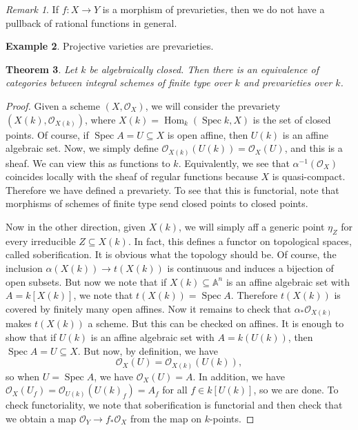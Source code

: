 \documentclass[leqno, openany]{memoir}
\newtheorem{thm}{Theorem}[section]
\theoremstyle{definition}
\newtheorem{exm}[thm]{Example}
\theoremstyle{remark}
\newtheorem{rmk}[thm]{Remark}
\theoremstyle{plain}
\theoremstyle{definition}
\theoremstyle{remark}
\newcommand{\A}{\mathbb{A}}
\newcommand{\msc}[1]{\mathscr{#1}}
\DeclareMathOperator{\Hom}{Hom}
\DeclareMathOperator{\Spec}{Spec}
\begin{document}
\begin{rmk}
    If $f \colon X \to Y$ is a morphism of prevarieties, then we do not have a pullback of rational functions in general.
\end{rmk}

\begin{exm}
    Projective varieties are prevarieties.
\end{exm}

\begin{thm}
    Let $k$ be algebraically closed. Then there is an equivalence of categories between integral schemes of finite type over $k$ and prevarieties over $k$. 
\end{thm}

\begin{proof}
    Given a scheme $(X, \msc{O}_X)$, we will consider the prevariety $(X(k), \msc{O}_{X(k)})$, where $X(k) = \Hom_k(\Spec k, X)$ is the set of closed points. Of course, if $\Spec A = U \subseteq X$ is open affine, then $U(k)$ is an affine algebraic set. Now, we simply define $\msc{O}_{X(k)} (U(k)) = \msc{O}_X(U)$, and this is a sheaf. We can view this as functions to $k$. Equivalently, we see that $\alpha^{-1}(\msc{O}_X)$ coincides locally with the sheaf of regular functions because $X$ is quasi-compact. Therefore we have defined a prevariety. To see that this is functorial, note that morphisms of schemes of finite type send closed points to closed points.

    Now in the other direction, given $X(k)$, we will simply aff a generic point $\eta_Z$ for every irreducible $Z \subseteq X(k)$. In fact, this defines a functor on topological spaces, called soberification. It is obvious what the topology should be. Of course, the inclusion $\alpha(X(k)) \to t(X(k))$ is continuous and induces a bijection of open subsets. But now we note that if $X(k) \subseteq \A^n$ is an affine algebraic set with $A = k[X(k)]$, we note that $t(X(k)) = \Spec A$. Therefore $t(X(k))$ is covered by finitely many open affines. Now it remains to check that $\alpha_* \msc{O}_{X(k)}$ makes $t(X(k))$ a scheme. But this can be checked on affines. It is enough to show that if $U(k)$ is an affine algebraic set with $A = k(U(k))$, then $\Spec A = U \subseteq X$. But now, by definition, we have
    \[ \msc{O}_X(U) = \msc{O}_{X(k)}(U(k)), \]
    so when $U = \Spec A$, we have $\msc{O}_X(U) = A$. In addition, we have $\msc{O}_X(U_f) = \msc{O}_{U(k)}({U(k)}_f) = A_f$ for all $f \in k[U(k)]$, so we are done. To check functoriality, we note that soberification is functorial and then check that we obtain a map $\msc{O}_Y \to f_* \msc{O}_X$ from the map on $k$-points.
\end{proof}
\end{document}
